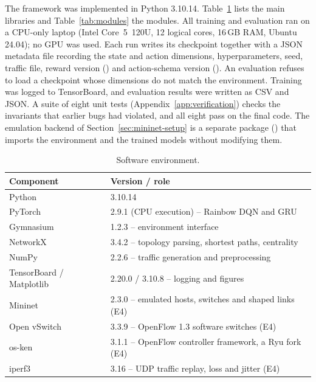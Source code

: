 The framework was implemented in Python 3.10.14. Table~\ref{tab:software} lists the main libraries and Table~\ref{tab:modules} the modules. All training and evaluation ran on a CPU-only laptop (Intel Core~5~120U, 12 logical cores, 16\,GB RAM, Ubuntu 24.04); no GPU was used. Each run writes its checkpoint together with a JSON metadata file recording the state and action dimensions, hyperparameters, seed, traffic file, reward version () and action-schema version (). An evaluation refuses to load a checkpoint whose dimensions do not match the environment. Training was logged to TensorBoard, and evaluation results were written as CSV and JSON. A suite of eight unit tests (Appendix~\ref{app:verification}) checks the invariants that earlier bugs had violated, and all eight pass on the final code. The emulation backend of Section~\ref{sec:mininet-setup} is a separate package () that imports the environment and the trained models without modifying them.

\begin{table}[htbp]
\centering
\caption{Software environment.}
\label{tab:software}
\small
\begin{tabular}{@{}ll@{}}
\toprule
\textbf{Component} & \textbf{Version / role}\\
\midrule
Python & 3.10.14\\
PyTorch~\cite{paszke2019pytorch} & 2.9.1 (CPU execution) -- Rainbow DQN and GRU\\
Gymnasium~\cite{towers2024gymnasium} & 1.2.3 -- environment interface\\
NetworkX~\cite{hagberg2008networkx} & 3.4.2 -- topology parsing, shortest paths, centrality\\
NumPy & 2.2.6 -- traffic generation and preprocessing\\
TensorBoard / Matplotlib & 2.20.0 / 3.10.8 -- logging and figures\\
\midrule
Mininet~\cite{lantz2010mininet} & 2.3.0 -- emulated hosts, switches and shaped links (E4)\\
Open vSwitch~\cite{pfaff2015ovs} & 3.3.9 -- OpenFlow 1.3 software switches (E4)\\
os-ken~\cite{osken2024} & 3.1.1 -- OpenFlow controller framework, a Ryu fork (E4)\\
iperf3~\cite{esnet2024iperf3} & 3.16 -- UDP traffic replay, loss and jitter (E4)\\
\bottomrule
\end{tabular}
\end{table}

